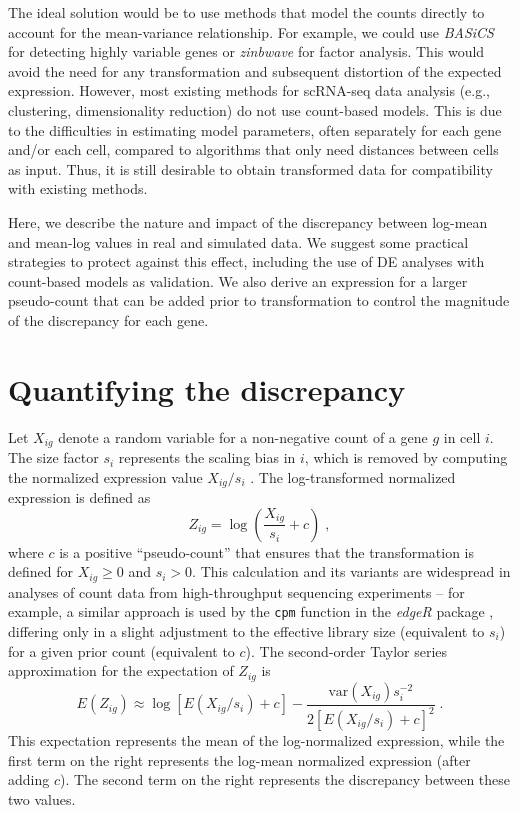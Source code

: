 \documentclass[10pt,letterpaper]{article}
\newcommand\code[1]{{\small\texttt{#1}}}
\begin{document}
The ideal solution would be to use methods that model the counts directly to account for the mean-variance relationship.
For example, we could use \textit{BASiCS} \cite{vallejos2016beyond} for detecting highly variable genes or \textit{zinbwave} \cite{risso2018general} for factor analysis.
This would avoid the need for any transformation and subsequent distortion of the expected expression.
However, most existing methods for scRNA-seq data analysis (e.g., clustering, dimensionality reduction) do not use count-based models.
This is due to the difficulties in estimating model parameters, often separately for each gene and/or each cell,
compared to algorithms that only need distances between cells as input.
Thus, it is still desirable to obtain transformed data for compatibility with existing methods.

Here, we describe the nature and impact of the discrepancy between log-mean and mean-log values in real and simulated data.
We suggest some practical strategies to protect against this effect, including the use of DE analyses with count-based models as validation.
We also derive an expression for a larger pseudo-count that can be added prior to transformation to control the magnitude of the discrepancy for each gene.

\section{Quantifying the discrepancy}
Let $X_{ig}$ denote a random variable for a non-negative count of a gene $g$ in cell $i$.
The size factor $s_i$ represents the scaling bias in $i$, which is removed by computing the normalized expression value $X_{ig}/s_i$ \cite{anders2010differential}.
The log-transformed normalized expression is defined as 
\[
Z_{ig} = \log\left(\frac{X_{ig}}{s_i}+ c\right) \;,
\]
where $c$ is a positive ``pseudo-count'' that ensures that the transformation is defined for $X_{ig} \ge 0$ and $s_i > 0$.
This calculation and its variants are widespread in analyses of count data from high-throughput sequencing experiments -- for example, a similar approach is used by the \code{cpm} function in the \textit{edgeR} package \cite{robinson2010edgeR}, differing only in a slight adjustment to the effective library size (equivalent to $s_i$) for a given prior count (equivalent to $c$).
The second-order Taylor series approximation for the expectation of $Z_{ig}$ is
\[
E(Z_{ig}) \approx \log[E(X_{ig}/s_i) + c] - \frac{\mbox{var}(X_{ig})s_i^{-2}}{2[E(X_{ig}/s_i) + c]^2} \;.
\]
This expectation represents the mean of the log-normalized expression, while the first term on the right represents the log-mean normalized expression (after adding $c$). 
The second term on the right represents the discrepancy between these two values.
\end{document}
